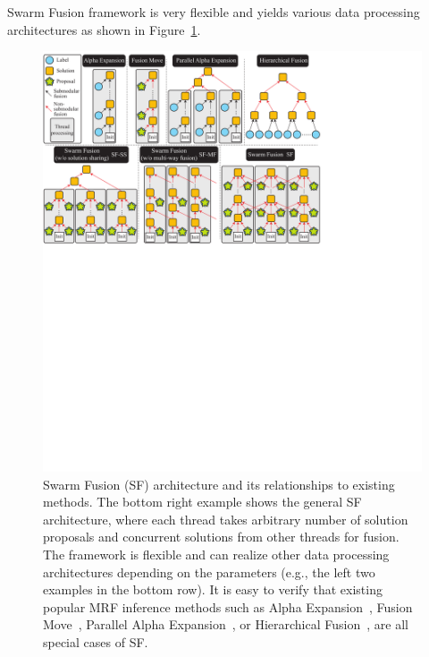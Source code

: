 Swarm Fusion framework is very flexible and yields various data
processing architectures as shown in Figure~\ref{fig:model}.
%
\begin{figure}[tb]
 \includegraphics[width=\columnwidth]{figure/model.pdf} \caption{Swarm
   Fusion (SF) architecture and its relationships to existing methods. The
 bottom right example shows the general SF architecture, where
 each thread takes arbitrary number of solution proposals and concurrent
 solutions from other threads for fusion. The framework is flexible and
 can realize other data processing architectures depending on the
 parameters (e.g., the left two examples in the bottom row).
 It is easy to verify that existing popular MRF inference methods such
 as Alpha Expansion~\cite{alpha_expansion}, Fusion Move~\cite{FM},
 Parallel Alpha Expansion~\cite{delong}, or Hierarchical
 Fusion~\cite{delong_hierarchical_fusion,olga}, are all special cases of
 SF.}
 \label{fig:model}
\end{figure}
